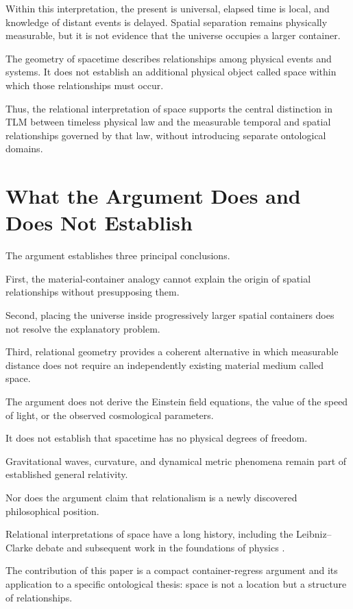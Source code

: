 \documentclass[12pt,onecolumn]{article}
\begin{document}
Within this interpretation, the present is universal,
elapsed time is local, and knowledge of distant events is
delayed. Spatial separation remains physically measurable,
but it is not evidence that the universe occupies a larger
container.

The geometry of spacetime describes relationships among
physical events and systems. It does not establish an
additional physical object called space within which those
relationships must occur.

Thus, the relational interpretation of space supports the
central distinction in TLM between timeless physical law
and the measurable temporal and spatial relationships
governed by that law, without introducing separate
ontological domains.

\section{What the Argument Does and Does Not Establish}

The argument establishes
three principal conclusions.

First, the material-container
analogy cannot explain the
origin of spatial relationships
without presupposing them.

Second, placing the universe
inside progressively larger
spatial containers does not
resolve the explanatory problem.

Third, relational geometry
provides a coherent alternative
in which measurable distance
does not require an independently
existing material medium
called space.

The argument does not derive
the Einstein field equations,
the value of the speed of light,
or the observed cosmological
parameters.

It does not establish that
spacetime has no physical
degrees of freedom.

Gravitational waves, curvature,
and dynamical metric phenomena
remain part of established
general relativity.

Nor does the argument claim
that relationalism is a newly
discovered philosophical position.

Relational interpretations
of space have a long history,
including the Leibniz--Clarke
debate and subsequent work
in the foundations of physics
\citep{alexander1956,barbour1982}.

The contribution of this paper
is a compact container-regress
argument and its application
to a specific ontological thesis:
space is not a location but
a structure of relationships.
\end{document}
